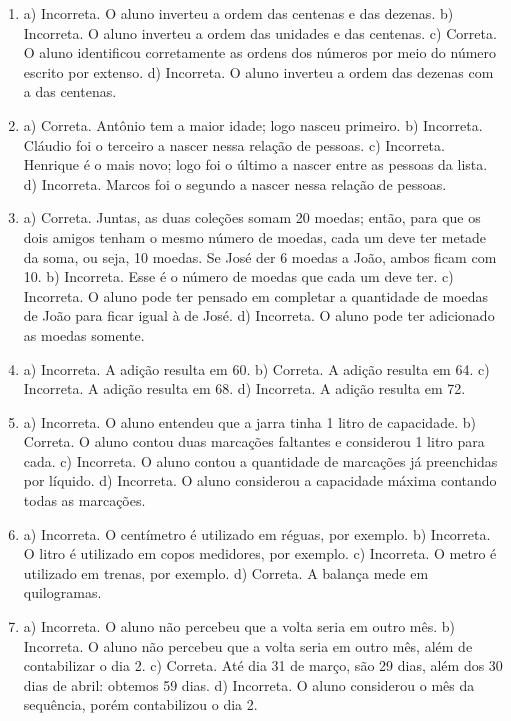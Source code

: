 
\begin{enumerate}
\item
a) Incorreta. O aluno inverteu a ordem das centenas e das dezenas.
b) Incorreta. O aluno inverteu a ordem das unidades e das centenas.
c) Correta. O aluno identificou corretamente as ordens dos números
por meio do número escrito por extenso.
d) Incorreta. O aluno inverteu a ordem das dezenas com a das centenas.

\item
a) Correta. Antônio tem a maior idade; logo nasceu primeiro.
b) Incorreta. Cláudio foi o terceiro a nascer nessa relação de pessoas.
c) Incorreta. Henrique é o mais novo; logo foi o último a nascer entre as pessoas da lista.
d) Incorreta. Marcos foi o segundo a nascer nessa relação de pessoas.

\item
a) Correta. Juntas, as duas coleções somam 20 moedas; então, para que os dois amigos tenham o mesmo número de moedas, cada um deve ter metade da soma, ou seja, 10 moedas. Se José der 6 moedas a João, ambos ficam com 10.
b) Incorreta. Esse é o número de moedas que cada um deve ter.
c) Incorreta. O aluno pode ter pensado em completar a quantidade de
moedas de João para ficar igual à de José.
d) Incorreta. O aluno pode ter adicionado as moedas somente.

\item
a) Incorreta. A adição resulta em 60.
b) Correta. A adição resulta em 64.
c) Incorreta. A adição resulta em 68.
d) Incorreta. A adição resulta em 72.

\item
a) Incorreta. O aluno entendeu que a jarra tinha 1 litro de capacidade.
b) Correta. O aluno contou duas marcações faltantes e considerou 1
litro para cada.
c) Incorreta. O aluno contou a quantidade de marcações já preenchidas
por líquido.
d) Incorreta. O aluno considerou a capacidade máxima contando todas as marcações.

\item
a) Incorreta. O centímetro é utilizado em réguas, por exemplo.
b) Incorreta. O litro é utilizado em copos medidores, por exemplo.
c) Incorreta. O metro é utilizado em trenas, por exemplo.
d) Correta. A balança mede em quilogramas.

\item
a) Incorreta. O aluno não percebeu que a volta seria em outro mês.
b) Incorreta. O aluno não percebeu que a volta seria em outro mês, além
de contabilizar o dia 2.
c) Correta. Até dia 31 de março, são 29 dias, além dos 30 dias de abril: obtemos
59 dias.
d) Incorreta. O aluno considerou o mês da sequência, porém contabilizou
o dia 2.


\end{enumerate}
